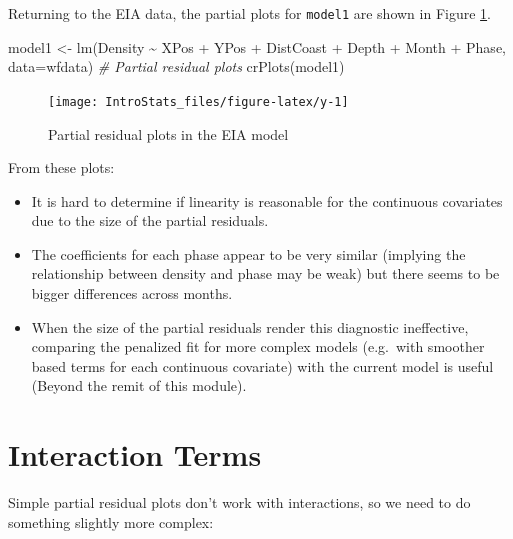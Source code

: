 \documentclass[
  oneside]{krantz}
\newenvironment{Shaded}{\begin{snugshade}}{\end{snugshade}}
\newcommand{\AttributeTok}[1]{\textcolor[rgb]{0.77,0.63,0.00}{#1}}
\newcommand{\CommentTok}[1]{\textcolor[rgb]{0.56,0.35,0.01}{\textit{#1}}}
\newcommand{\FunctionTok}[1]{\textcolor[rgb]{0.00,0.00,0.00}{#1}}
\newcommand{\NormalTok}[1]{#1}
\newcommand{\OtherTok}[1]{\textcolor[rgb]{0.56,0.35,0.01}{#1}}
\newcommand{\SpecialCharTok}[1]{\textcolor[rgb]{0.00,0.00,0.00}{#1}}
\providecommand{\tightlist}{%
  \setlength{\itemsep}{0pt}\setlength{\parskip}{0pt}}
\begin{document}
Returning to the EIA data, the partial plots for \texttt{model1} are shown in Figure \ref{fig:y}.

\begin{Shaded}
\begin{Highlighting}[]
\NormalTok{model1 }\OtherTok{\textless{}{-}} \FunctionTok{lm}\NormalTok{(Density }\SpecialCharTok{\textasciitilde{}}\NormalTok{ XPos }\SpecialCharTok{+}\NormalTok{ YPos }\SpecialCharTok{+}\NormalTok{ DistCoast }\SpecialCharTok{+}\NormalTok{ Depth }\SpecialCharTok{+} 
\NormalTok{                Month }\SpecialCharTok{+}\NormalTok{ Phase, }\AttributeTok{data=}\NormalTok{wfdata)}
\CommentTok{\# Partial residual plots}
\FunctionTok{crPlots}\NormalTok{(model1)}
\end{Highlighting}
\end{Shaded}

\begin{figure}

{\centering \texttt{[image: IntroStats\_files/figure-latex/y-1]} 

}

\caption{Partial residual plots in the EIA model}\label{fig:y}
\end{figure}

From these plots:

\begin{itemize}
\tightlist
\item
  It is hard to determine if linearity is reasonable for the continuous covariates due to the size of the partial residuals.
\item
  The coefficients for each phase appear to be very similar (implying the relationship between density and phase may be weak) but there seems to be bigger differences across months.
\item
  When the size of the partial residuals render this diagnostic ineffective, comparing the penalized fit for more complex models (e.g.~with smoother based terms for each continuous covariate) with the current model is useful (Beyond the remit of this module).
\end{itemize}

\hypertarget{interaction-terms}{%
\section{Interaction Terms}\label{interaction-terms}}

Simple partial residual plots don't work with interactions, so we need to do something slightly more complex:
\end{document}
